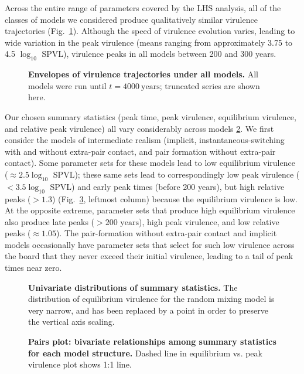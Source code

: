 \documentclass[10pt,letterpaper]{article}
\newcommand{\Lspvl}{$\log_{10}$ SPVL}
\begin{document}
Across the entire range of parameters covered by the LHS analysis, all of the classes of models we considered produce qualitatively similar virulence trajectories (Fig.~\ref{fig:virtraj}). Although the speed of virulence evolution varies, leading to wide variation in the peak virulence (means ranging from approximately 3.75 to 4.5 \Lspvl), virulence peaks in all models between 200 and 300 years.

\begin{figure}[!h]
\caption{{\bf Envelopes of virulence trajectories under all models.}
All models were run until $t=4000~\textrm{years}$; truncated series are shown here.}
\label{fig:virtraj}
\end{figure}

Our chosen summary statistics (peak time, peak virulence, equilibrium
virulence, and relative peak virulence) all vary considerably across models
\ref{fig:unidist}.
We first consider the models of intermediate realism (implicit,
instantaneous-switching with and without extra-pair contact, and
pair formation without extra-pair contact). Some parameter
sets for these models lead to low equilibrium virulence ($\approx 2.5 \log_{10}$ SPVL);
these same sets lead to correspondingly low
peak virulence ($< 3.5 \log_{10}$ SPVL) and early peak times (before 200 years), 
but high relative peaks ($>1.3$)
(Fig.~\ref{fig:pairplot}, leftmost column) because the equilibrium virulence is low.
At the opposite extreme, parameter sets that produce high equilibrium virulence 
also produce late peaks ($> 200 \text{ years}$), 
high peak virulence, and low relative peaks ($\approx 1.05$).
The pair-formation without extra-pair contact and implicit models
occasionally have parameter sets that select for such low virulence across
the board that they never exceed their initial virulence, leading to a tail
of peak times near zero.

\begin{figure}[!h]
\caption{{\bf Univariate distributions of summary statistics.}
The distribution of equilibrium virulence for the random mixing model is very narrow, and has been replaced by a point in order to preserve the vertical axis scaling.}
\label{fig:unidist}
\end{figure}

\begin{figure}[!h]
\caption{{\bf Pairs plot: bivariate relationships among summary statistics for each model structure.}
Dashed line in equilibrium vs. peak virulence plot shows 1:1 line.}
\label{fig:pairplot}
\end{figure}
\end{document}
